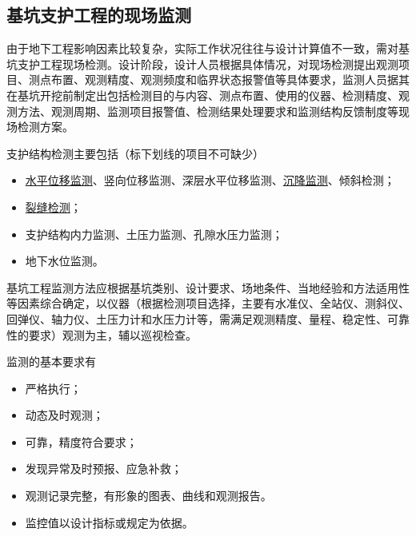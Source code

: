 \documentclass{book}
\begin{document}
\subsection{基坑支护工程的现场监测}
\par 由于地下工程影响因素比较复杂，实际工作状况往往与设计计算值不一致，需对基坑支护工程现场检测。设计阶段，设计人员根据具体情况，对现场检测提出观测项目、测点布置、观测精度、观测频度和临界状态报警值等具体要求，监测人员据其在基坑开挖前制定出包括检测目的与内容、测点布置、使用的仪器、检测精度、观测方法、观测周期、监测项目报警值、检测结果处理要求和监测结构反馈制度等现场检测方案。
\par 支护结构检测主要包括（标下划线的项目不可缺少）
\begin{itemize}
    \item \uline{水平位移监测}、竖向位移监测、深层水平位移监测、\uline{沉降监测}、倾斜检测；
    \item \uline{裂缝检测}；
    \item 支护结构内力监测、土压力监测、孔隙水压力监测；
    \item 地下水位监测。
\end{itemize}
\par 基坑工程监测方法应根据基坑类别、设计要求、场地条件、当地经验和方法适用性等因素综合确定，以仪器（根据检测项目选择，主要有水准仪、全站仪、测斜仪、回弹仪、轴力仪、土压力计和水压力计等，需满足观测精度、量程、稳定性、可靠性的要求）观测为主，辅以巡视检查。
\par 监测的基本要求有
\begin{itemize}
    \item 严格执行；
    \item 动态及时观测；
    \item 可靠，精度符合要求；
    \item 发现异常及时预报、应急补救；
    \item 观测记录完整，有形象的图表、曲线和观测报告。
    \item 监控值以设计指标或规定为依据。
\end{itemize}
\end{document}
